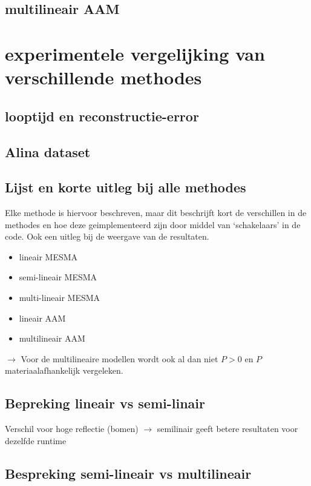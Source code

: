 \documentclass[12pt]{report}
\begin{document}
\section{multilineair AAM}

\chapter{experimentele vergelijking van verschillende methodes}

\section{looptijd en reconstructie-error}

\section{Alina dataset}

\section{Lijst en korte uitleg bij alle methodes}

Elke methode is hiervoor beschreven, maar dit beschrijft kort de verschillen in de methodes en hoe deze geimplementeerd zijn door middel van `schakelaars' in de code. Ook een uitleg bij de weergave van de resultaten. 

\begin{itemize}
\item lineair MESMA
\item semi-lineair MESMA
\item multi-lineair MESMA
\item lineair AAM
\item multilineair AAM
\end{itemize}

$\rightarrow$ Voor de multilineaire modellen wordt ook al dan niet $P> 0$ en $P$ materiaalafhankelijk vergeleken.



\section{Bepreking lineair vs semi-linair}

Verschil voor hoge reflectie (bomen)
$\rightarrow$ semilinair geeft betere resultaten voor dezelfde runtime

\section{Bespreking semi-lineair vs multilineair}
\end{document}
